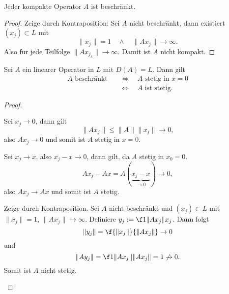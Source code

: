 \begin{st} \label{1.26}
	Jeder kompakte Operator $A$ ist beschränkt.
	\begin{proof}
		Zeige durch Kontraposition:
		Sei $A$ nicht beschränkt, dann existiert $(x_j) \subset L$ mit 
		\[
			\|x_j\| = 1  \quad\land\quad \|Ax_j\| \to \infty.
		\]
		Also für jede Teilfolge $\|Ax_{j_k}\| \to \infty$.
		Damit ist $A$ nicht kompakt.
	\end{proof}
\end{st}

\begin{st} \label{1.27}
	Sei $A$ ein linearer Operator in $L$ mit $D(A) = L$.
	Dann gilt
	\begin{align*}
		A \text{ beschränkt} 
		&\quad\iff\quad A \text{ stetig in } x = 0 \\
		&\quad\iff\quad A \text{ ist stetig.}
	\end{align*}
	\begin{proof}
		\begin{seg}[$A$ beschränkt $\implies$ $A$ stetig in $x=0$]
			Sei $x_j \to 0$, dann gilt
			\[
				\|Ax_j\| \le \|A\| \|x_j\| \to 0,
			\]
			also $Ax_j \to 0$ und somit ist $A$ stetig in $x=0$.
		\end{seg}
		\begin{seg}[$A$ stetig in $x_0=0$ $\implies$ $A$ stetig]
			Sei $x_j \to x$, also $x_j - x \to 0$, dann gilt, da $A$ stetig in $x_0=0$.
			\[
				Ax_j - Ax = A(\underbrace{x_j - x}_{\to 0}) \to 0,
			\]
			also $Ax_j \to Ax$ und somit ist $A$ stetig.
		\end{seg}
		\begin{seg}
			Zeige durch Kontraposition.
			Sei $A$ nicht beschränkt und $(x_j) \subset L$ mit $\|x_j\| = 1$, $\|Ax_j\| \to \infty$.
			Definiere $y_j := \f 1{\|Ax_j\|}x_j$.
			Dann folgt
			\[
				\|y_j\| = \f {\|x_j\|}{\|Ax_j\|} \to 0
			\]
			und
			\[
				\|Ay_j\| = \f 1{\|Ax_j\|} \|Ax_j\| = 1 \not\to 0.
			\]
			Somit ist $A$ nicht stetig.
		\end{seg}
	\end{proof}
\end{st}

